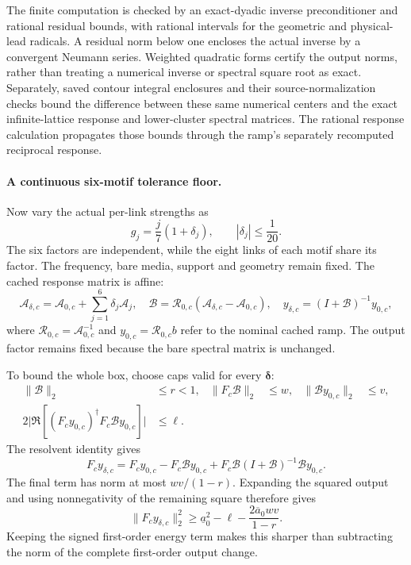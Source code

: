 The finite computation is checked by an exact-dyadic inverse preconditioner and rational residual bounds, with rational intervals for the geometric and physical-lead radicals. A residual norm below one encloses the actual inverse by a convergent Neumann series. Weighted quadratic forms certify the output norms, rather than treating a numerical inverse or spectral square root as exact. Separately, saved contour integral enclosures and their source-normalization checks bound the difference between these same numerical centers and the exact infinite-lattice response and lower-cluster spectral matrices. The rational response calculation propagates those bounds through the ramp's separately recomputed reciprocal response.

\paragraph*{A continuous six-motif tolerance floor.}
Now vary the actual per-link strengths as
\begin{equation}
 g_j=\frac{j}{7}(1+\delta_j),\qquad |\delta_j|\le\frac1{20}.
 \label{eq:sm-ramp-coupling-box}
\end{equation}
The six factors are independent, while the eight links of each motif share its factor. The frequency, bare media, support and geometry remain fixed. The cached response matrix is affine:
\begin{equation}
 \mathcal A_{\delta,c}=\mathcal A_{0,c}+\sum_{j=1}^6\delta_j\mathcal A_j,
 \quad \mathcal B=\mathcal R_{0,c}(\mathcal A_{\delta,c}-\mathcal A_{0,c}),
 \quad y_{\delta,c}=(I+\mathcal B)^{-1}y_{0,c},
 \label{eq:sm-ramp-cached-box}
\end{equation}
where $\mathcal R_{0,c}=\mathcal A_{0,c}^{-1}$ and $y_{0,c}=\mathcal R_{0,c}b$ refer to the nominal cached ramp. The output factor remains fixed because the bare spectral matrix is unchanged.

To bound the whole box, choose caps valid for every $\bm\delta$:
\begin{align}
 \|\mathcal B\|_2&\le r<1,&
 \|F_c\mathcal B\|_2&\le w,&
 \|\mathcal B y_{0,c}\|_2&\le v,\nonumber\\
 2\big|\Re[(F_cy_{0,c})^\dagger F_c\mathcal B y_{0,c}]\big|&\le\ell.
 \label{eq:sm-ramp-energy-caps}
\end{align}
The resolvent identity gives
\begin{equation}
 F_cy_{\delta,c}=F_cy_{0,c}-F_c\mathcal B y_{0,c}
 +F_c\mathcal B(I+\mathcal B)^{-1}\mathcal B y_{0,c}.
 \label{eq:sm-ramp-energy-expansion}
\end{equation}
The final term has norm at most $wv/(1-r)$. Expanding the squared output and using nonnegativity of the remaining square therefore gives
\begin{equation}
 \|F_cy_{\delta,c}\|_2^2
 \ge\underline a_0^2-\ell-\frac{2\overline a_0wv}{1-r}.
 \label{eq:sm-ramp-cached-energy-floor}
\end{equation}
Keeping the signed first-order energy term makes this sharper than subtracting the norm of the complete first-order output change.

